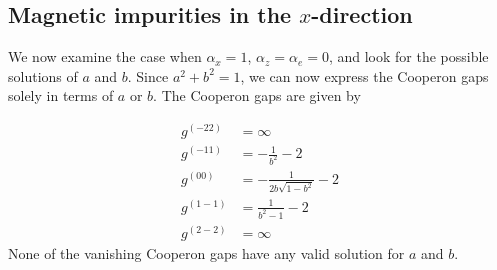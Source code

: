 \documentclass[aps,prb,amsmath,amssymb,footinbib,showpacs,twocolumn]{revtex4-2}
\begin{document}
\begin{widetext}
\section{Magnetic impurities in the $x$-direction}
We now examine the case when $\alpha_x=1$, $\alpha_z=\alpha_e=0$, and look for the possible solutions of $a$ and $b$. Since $a^2+b^2=1$, we can now express the Cooperon gaps solely in terms of $a$ or $b$. The Cooperon gaps are given by 

\begin{align}
    g^{(-22)}&=\infty\nonumber\\
    g^{(-11)}&=-\frac{1}{b^2}-2\nonumber\\
    g^{(00)}&=-\frac{1}{2 b \sqrt{1-b^2}}-2\nonumber\\
    g^{(1-1)}&=\frac{1}{b^2-1}-2\nonumber\\
    g^{(2-2)}&=\infty
\end{align}
None of the vanishing Cooperon gaps have any valid solution for $a$ and $b$. 
\end{widetext}
\end{document}
